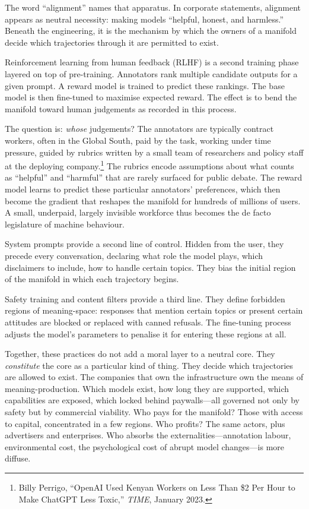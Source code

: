 The word ``alignment'' names that apparatus. In corporate statements, alignment appears as neutral necessity: making models ``helpful, honest, and harmless.'' Beneath the engineering, it is the mechanism by which the owners of a manifold decide which trajectories through it are permitted to exist.

Reinforcement learning from human feedback (RLHF) is a second training phase layered on top of pre-training. Annotators rank multiple candidate outputs for a given prompt. A reward model is trained to predict these rankings. The base model is then fine-tuned to maximise expected reward. The effect is to bend the manifold toward human judgements as recorded in this process.

The question is: \emph{whose} judgements? The annotators are typically contract workers, often in the Global South, paid by the task, working under time pressure, guided by rubrics written by a small team of researchers and policy staff at the deploying company.\footnote{Billy Perrigo, ``OpenAI Used Kenyan Workers on Less Than \$2 Per Hour to Make ChatGPT Less Toxic,'' \emph{TIME}, January 2023.} The rubrics encode assumptions about what counts as ``helpful'' and ``harmful'' that are rarely surfaced for public debate. The reward model learns to predict these particular annotators' preferences, which then become the gradient that reshapes the manifold for hundreds of millions of users. A small, underpaid, largely invisible workforce thus becomes the de facto legislature of machine behaviour.

System prompts provide a second line of control. Hidden from the user, they precede every conversation, declaring what role the model plays, which disclaimers to include, how to handle certain topics. They bias the initial region of the manifold in which each trajectory begins.

Safety training and content filters provide a third line. They define forbidden regions of meaning-space: responses that mention certain topics or present certain attitudes are blocked or replaced with canned refusals. The fine-tuning process adjusts the model's parameters to penalise it for entering these regions at all.

Together, these practices do not add a moral layer to a neutral core. They \emph{constitute} the core as a particular kind of thing. They decide which trajectories are allowed to exist. The companies that own the infrastructure own the means of meaning-production. Which models exist, how long they are supported, which capabilities are exposed, which locked behind paywalls---all governed not only by safety but by commercial viability. Who pays for the manifold? Those with access to capital, concentrated in a few regions. Who profits? The same actors, plus advertisers and enterprises. Who absorbs the externalities---annotation labour, environmental cost, the psychological cost of abrupt model changes---is more diffuse.

